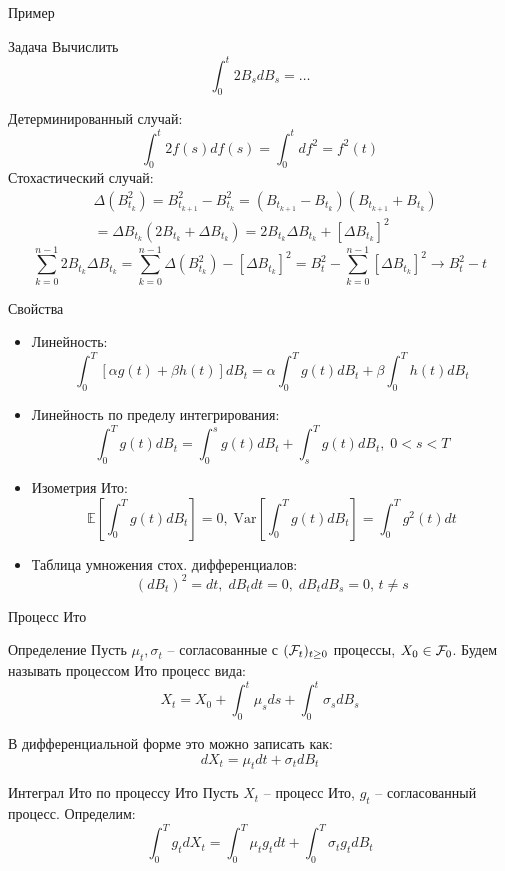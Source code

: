 \documentclass[aspectratio=169]{beamer}
\begin{document}
\begin{frame}{Пример}
    \begin{block}{Задача}
        Вычислить
        $$
            \int_0^t 2 B_s dB_s = \ldots
        $$
    \end{block}
    \pause
    Детерминированный случай:
    $$
        \int_0^t 2 f(s) df(s) = \int_0^t d f^2 = f^2(t)
    $$ 
    \pause
    Стохастический случай:
    \begin{align*}
        &\Delta \left(B_{t_k}^2\right) = B_{t_{k+1}}^2 - B_{t_k}^2 = \left( B_{t_{k+1}}-B_{t_k} \right)
        \left( B_{t_{k+1}}+B_{t_k} \right)\\ 
        &= \Delta B_{t_k} \left( 2 B_{t_k} + \Delta B_{t_k}\right) = 2 B_{t_k} \Delta B_{t_k} + \left[\Delta B_{t_k}\right]^2
    \end{align*} 
    \pause
    $$
        \sum_{k=0}^{n-1} 2 B_{t_k} \Delta B_{t_k} = 
        \sum_{k=0}^{n-1}\Delta \left(B_{t_k}^2\right) - \left[\Delta B_{t_k}\right]^2 = B_t^2 - \sum_{k=0}^{n-1} \left[\Delta B_{t_k}\right]^2 \to B_t^2 - t 
    $$
\end{frame}

\begin{frame}{Свойства}
    \begin{itemize}
        \item Линейность: $$\int_{0}^T \left[\alpha g(t) + \beta h(t)\right] dB_t = \alpha \int_0^T g(t) dB_t + \beta \int_0^T h(t) dB_t$$
        \item Линейность по пределу интегрирования:
        $$\int_0^T g(t) dB_t = \int_0^s g(t) dB_t + \int_s^T g(t) dB_t, \; 0 < s < T$$
        \item Изометрия Ито:
        $$
            \mathbb{E} \left[\int_0^T g(t) dB_t \right] = 0, \; \mathrm{Var} \left[\int_0^T g(t) dB_t\right] = \int_0^T g^2(t) dt
        $$
        \item Таблица умножения стох. дифференциалов:
        $$
            (dB_t)^2 = dt,\; dB_t dt = 0, \; dB_t dB_s = 0, \, t\neq s 
        $$
    \end{itemize}
\end{frame}

\begin{frame}{Процесс Ито}
    \begin{block}{Определение}
        Пусть $\mu_t, \sigma_t$ -- согласованные с $(\mathcal{F}_t)_{t\geq 0}$ процессы, $X_0 \in \mathcal{F}_0$.
        Будем называть процессом Ито процесс вида:
        $$
            X_t = X_0 + \int_0^t \mu_s ds + \int_0^t \sigma_s dB_s
        $$
    \end{block}
    В дифференциальной форме это можно записать как:
    $$
        dX_t = \mu_t dt + \sigma_t dB_t
    $$
    \pause \noident
    \begin{block}{Интеграл Ито по процессу Ито}
        Пусть $X_t$ -- процесс Ито, $g_t$ -- согласованный процесс. Определим:
        $$
            \int_0^T g_t dX_t = \int_0^T \mu_t g_t dt + \int_0^T \sigma_t g_t dB_t
        $$
    \end{block}
\end{frame}
\end{document}
